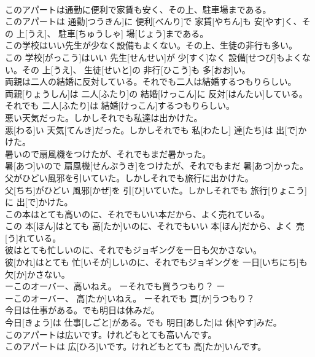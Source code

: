 \documentclass[8pt]{extreport}
\begin{document}
\begin{CJK}{UTF8}{min}
\\	このアパートは通勤に便利で家賃も安く、その上、駐車場まである。	
\\	このアパートは 通勤[つうきん]に 便利[べんり]で 家賃[やちん]も 安[やす]く、その 上[うえ]、 駐車[ちゅうしゃ] 場[じょう]まである。
\\	この学校はいい先生が少なく設備もよくない。その上、生徒の非行も多い。	
\\	この 学校[がっこう]はいい 先生[せんせい]が 少[すく]なく 設備[せつび]もよくない。その 上[うえ]、 生徒[せいと]の 非行[ひこう]も 多[おお]い。
\\	両親は二人の結婚に反対している。それでも二人は結婚するつもりらしい。	
\\	両親[りょうしん]は 二人[ふたり]の 結婚[けっこん]に 反対[はんたい]している。それでも 二人[ふたり]は 結婚[けっこん]するつもりらしい。
\\	悪い天気だった。しかしそれでも私達は出かけた。	
\\	悪[わる]い 天気[てんき]だった。しかしそれでも 私[わたし] 達[たち]は 出[で]かけた。
\\	暑いので扇風機をつけたが、それでもまだ暑かった。	
\\	暑[あつ]いので 扇風機[せんぷうき]をつけたが、それでもまだ 暑[あつ]かった。
\\	父がひどい風邪を引いていた。しかしそれでも旅行に出かけた。	
\\	父[ちち]がひどい 風邪[かぜ]を 引[ひ]いていた。しかしそれでも 旅行[りょこう]に 出[で]かけた。
\\	この本はとても高いのに、それでもいい本だから、よく売れている。	
\\	この 本[ほん]はとても 高[たか]いのに、それでもいい 本[ほん]だから、よく 売[う]れている。
\\	彼はとても忙しいのに、それでもジョギングを一日も欠かさない。	
\\	彼[かれ]はとても 忙[いそが]しいのに、それでもジョギングを 一日[いちにち]も 欠[か]かさない。
\\	ーこのオーバー、高いねえ。 ーそれでも買うつもり？	ー
\\	ーこのオーバー、 高[たか]いねえ。 ーそれでも 買[か]うつもり？
\\	今日は仕事がある。でも明日は休みだ。	
\\	今日[きょう]は 仕事[しごと]がある。でも 明日[あした]は 休[やす]みだ。
\\	このアパートは広いです。けれどもとても高いんです。	
\\	このアパートは 広[ひろ]いです。けれどもとても 高[たか]いんです。

\end{CJK}
\end{document}
